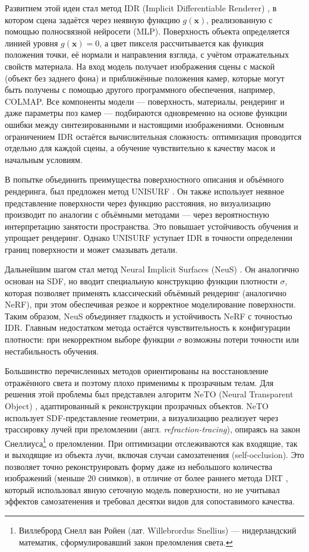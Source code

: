 Развитием этой идеи стал метод IDR (Implicit Differentiable Renderer)
\cite{yariv2020multiviewneuralsurfacereconstruction}, в котором сцена задаётся
через неявную функцию $g(\mathbf{x})$, реализованную с помощью полносвязной
нейросети (MLP). Поверхность объекта определяется линией уровня $g(\mathbf{x}) =
0$, а цвет пикселя рассчитывается как функция положения точки, её нормали и
направления взгляда, с учётом отражательных свойств материала. На вход модель
получает изображения сцены с маской (объект без заднего фона) и приближённые
положения камер, которые могут быть получены с помощью другого программного
обеспечения, например, COLMAP. Все компоненты модели — поверхность, материалы,
рендеринг и даже параметры поз камер — подбираются одновременно на основе
функции ошибки между синтезированными и настоящими изображениями. Основным
ограничением IDR остаётся вычислительная сложность: оптимизация проводится
отдельно для каждой сцены, а обучение чувствительно к качеству масок и начальным
условиям.

В попытке объединить преимущества поверхностного описания и объёмного
рендеринга, был предложен метод UNISURF
\cite{oechsle2021unisurfunifyingneuralimplicit}. Он также использует неявное
представление поверхности через функцию расстояния, но визуализацию производит
по аналогии с объёмными методами — через вероятностную интерпретацию занятости
пространства. Это повышает устойчивость обучения и упрощает рендеринг. Однако
UNISURF уступает IDR в точности определении границ поверхности и может смазывать
детали.

Дальнейшим шагом стал метод Neural Implicit Surfaces (NeuS)
\cite{wang2023neuslearningneuralimplicit}. Он аналогично основан на SDF, но вводит
специальную конструкцию функции плотности $\sigma$, которая позволяет применять
классический объёмный рендеринг (аналогично NeRF), при этом обеспечивая резкое и
корректное моделирование поверхности. Таким образом, NeuS объединяет гладкость и
устойчивость NeRF с точностью IDR. Главным недостатком метода остаётся
чувствительность к конфигурации плотности: при некорректном выборе функции
$\sigma$ возможны потери точности или нестабильность обучения.

Большинство перечисленных методов ориентированы на восстановление отражённого
света и поэтому плохо применимы к прозрачным телам. Для решения этой проблемы
был представлен алгоритм NeTO (Neural Transparent Object)
\cite{li2023netoneuralreconstructiontransparentobjects}, адаптированный к
реконструкции прозрачных объектов. NeTO использует SDF-представление геометрии,
а визуализацию реализует через трассировку
лучей при преломлении (англ. \emph{refraction-tracing}), опираясь на закон Снеллиуса\footnote{Виллеброрд Снелл ван Ройен (лат.
Willebrordus Snellius) — нидерландский математик, сформулировавший закон
преломления света.} о преломлении. При оптимизации отслеживаются как входящие, так и
выходящие из объекта лучи, включая случаи самозатенения (self-occlusion). Это
позволяет точно реконструировать форму даже из небольшого количества изображений
(меньше 20 снимков), в отличие от более раннего метода DRT
\cite{Lyu_2020}, который использовал явную сеточную модель поверхности, но не
учитывал эффектов самозатенения и требовал десятки видов для сопоставимого
качества.

